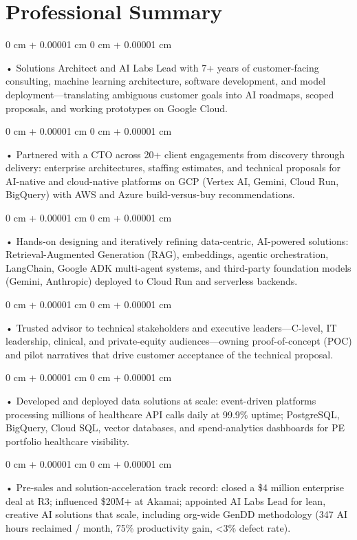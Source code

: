 \documentclass[10pt, letterpaper]{article}
\newenvironment{onecolentry}{
    \begin{adjustwidth}{
        0 cm + 0.00001 cm
    }{
        0 cm + 0.00001 cm
    }
}{
    \end{adjustwidth}
} %
\begin{document}
    \section{Professional Summary}
        \vspace{2 pt }
        \begin{onecolentry}
            • Solutions Architect and AI Labs Lead with 7+ years of customer-facing consulting, machine learning architecture, software development, and model deployment---translating ambiguous customer goals into AI roadmaps, scoped proposals, and working prototypes on Google Cloud.
        \end{onecolentry}
        \begin{onecolentry}
            • Partnered with a CTO across 20+ client engagements from discovery through delivery: enterprise architectures, staffing estimates, and technical proposals for AI-native and cloud-native platforms on GCP (Vertex AI, Gemini, Cloud Run, BigQuery) with AWS and Azure build-versus-buy recommendations.
        \end{onecolentry}
        \begin{onecolentry}
            • Hands-on designing and iteratively refining data-centric, AI-powered solutions: Retrieval-Augmented Generation (RAG), embeddings, agentic orchestration, LangChain, Google ADK multi-agent systems, and third-party foundation models (Gemini, Anthropic) deployed to Cloud Run and serverless backends.
        \end{onecolentry}
        \begin{onecolentry}
            • Trusted advisor to technical stakeholders and executive leaders---C-level, IT leadership, clinical, and private-equity audiences---owning proof-of-concept (POC) and pilot narratives that drive customer acceptance of the technical proposal.
        \end{onecolentry}
        \begin{onecolentry}
            • Developed and deployed data solutions at scale: event-driven platforms processing millions of healthcare API calls daily at 99.9\% uptime; PostgreSQL, BigQuery, Cloud SQL, vector databases, and spend-analytics dashboards for PE portfolio healthcare visibility.
        \end{onecolentry}
        \begin{onecolentry}
            • Pre-sales and solution-acceleration track record: closed a \$4 million enterprise deal at R3; influenced \$20M+ at Akamai; appointed AI Labs Lead for lean, creative AI solutions that scale, including org-wide GenDD methodology (347 AI hours reclaimed / month, 75\% productivity gain, {<}3\% defect rate).
        \end{onecolentry}
\end{document}
